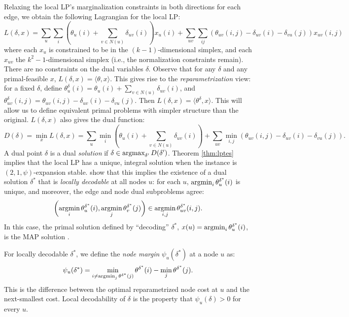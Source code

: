 Relaxing the
local LP's marginalization constraints in both directions for each edge, we obtain
the following Lagrangian for the local LP:
\[
L(\delta,x) = \sum_{u}\sum_i\left(\theta_u(i) + \sum_{v \in N(u)}\delta_{uv}(i)\right)x_u(i) + \sum_{uv}\sum_{ij}\left(\theta_{uv}(i,j) - \delta_{uv}(i) - \delta_{vu}(j)\right)x_{uv}(i,j)
\]
where each $x_u$ is constrained to be in the $(k-1)$-dimensional simplex, and each $x_{uv}$ the $k^2-1$-dimensional simplex (i.e., the normalization constraints remain). There are no constraints on the dual variables $\delta$. Observe that for any $\delta$ and any primal-feasible $x$, $L(\delta,x) = \langle \theta, x\rangle$. This gives rise to the \emph{reparametrization} view: for a fixed $\delta$, define $\theta^{\delta}_u(i) = \theta_u(i) + \sum_{v\in N(u)}\delta_{uv}(i)$, and $\theta^{\delta}_{uv}(i,j) = \theta_{uv}(i,j) - \delta_{uv}(i) - \delta_{vu}(j)$. Then $L(\delta, x) = \langle \theta^{\delta}, x\rangle$. This will allow us to define equivalent primal problems with simpler structure than the original. $L(\delta,x)$ also gives the dual function:
\[
D(\delta) = \min_x L(\delta,x) = \sum_{u}\min_{i}\left(\theta_u(i) + \sum_{v \in N(u)}\delta_{uv}(i)\right) + \sum_{uv}\min_{i,j}\left(\theta_{uv}(i,j) - \delta_{uv}(i) - \delta_{vu}(j)\right).
\]
A dual point $\delta$ is a dual \emph{solution} if $\delta \in \operatorname*{\text{argmax}}_{\delta'} D(\delta')$. Theorem \ref{thm:lptes} implies that the local LP has a unique, integral solution when the instance is $(2,1,\psi)$-expansion stable. 
\citet[Theorem 1.3]{sontag2011introduction} show that this implies the existence of a dual solution $\delta^*$ that is \emph{locally decodable} at all nodes $u$: for each $u$, $\operatorname*{\text{argmin}}_i \theta^{\delta^*}_u(i)$ is unique, and moreover, the edge and node dual subproblems agree:
\begin{equation}
\label{eqn:dual-subproblems-agree}
\left(\operatorname*{\text{argmin}}_i \theta^{\delta^*}_u(i), \operatorname*{\text{argmin}}_j \theta^{\delta^*}_v(j)\right) \in \operatorname*{\text{argmin}}_{i,j}\theta_{uv}^{\delta^*}(i,j).
\end{equation}
In this case, the primal solution defined by ``decoding'' $\delta^*$, $x(u) = \operatorname*{\text{argmin}}_i \theta^{\delta^*}_u(i)$, is the MAP solution \citep{sontag2011introduction}.

For locally decodable $\delta^*$, we define the \emph{node margin} $\psi_u(\delta^*)$ at a node $u$ as: \[
\psi_u(\delta^*) = \min_{i\ne \operatorname*{\text{argmin}}_j \theta^{\delta^*}(j)} \theta^{\delta^*}(i) - \min_j \theta^{\delta^*}(j).
\]
This is the difference between the optimal reparametrized node cost at $u$ and the next-smallest cost.
Local decodability of $\delta$ is the property that $\psi_u(\delta) > 0$ for every $u$. 


